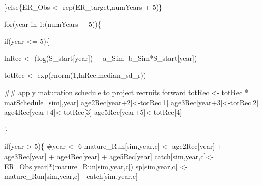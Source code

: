 \documentclass[
  11pt,
]{article}
\newenvironment{Shaded}{}{}
\newcommand{\CommentTok}[1]{\textcolor[rgb]{0.00,0.50,0.00}{#1}}
\newcommand{\ControlFlowTok}[1]{\textcolor[rgb]{0.00,0.00,1.00}{#1}}
\newcommand{\DecValTok}[1]{#1}
\newcommand{\KeywordTok}[1]{\textcolor[rgb]{0.00,0.00,1.00}{#1}}
\newcommand{\NormalTok}[1]{#1}
\newcommand{\OperatorTok}[1]{#1}
\newcommand{\StringTok}[1]{\textcolor[rgb]{0.00,0.50,0.50}{#1}}
\begin{document}
\begin{Shaded}
\begin{Highlighting}[]
{\NormalTok{        \}}\ControlFlowTok{else}\NormalTok{\{ER_Obs <-}\StringTok{ }\KeywordTok{rep}\NormalTok{(ER_target,numYears }\OperatorTok{+}\StringTok{ }\DecValTok{5}\NormalTok{)\}}
        
        
        \ControlFlowTok{for}\NormalTok{(year }\ControlFlowTok{in} \DecValTok{1}\OperatorTok{:}\NormalTok{(numYears }\OperatorTok{+}\StringTok{ }\DecValTok{5}\NormalTok{))\{}
          
          \ControlFlowTok{if}\NormalTok{(year }\OperatorTok{<=}\StringTok{ }\DecValTok{5}\NormalTok{)\{}
            
\NormalTok{            lnRec <-}\StringTok{ }\NormalTok{(}\KeywordTok{log}\NormalTok{(S_start[year]) }\OperatorTok{+}\StringTok{ }\NormalTok{a_Sim}\OperatorTok{-}\StringTok{ }\NormalTok{b_Sim}\OperatorTok{*}\NormalTok{S_start[year])}
            
\NormalTok{            totRec <-}\StringTok{ }\KeywordTok{exp}\NormalTok{(}\KeywordTok{rnorm}\NormalTok{(}\DecValTok{1}\NormalTok{,lnRec,median_sd_r))}
            
            \CommentTok{## apply maturation schedule to project recruits forward}
\NormalTok{            totRec <-}\StringTok{ }\NormalTok{totRec }\OperatorTok{*}\StringTok{ }\NormalTok{matSchedule_sim[,year]}
\NormalTok{            age2Rec[year}\OperatorTok{+}\DecValTok{2}\NormalTok{]<-totRec[}\DecValTok{1}\NormalTok{]}
\NormalTok{            age3Rec[year}\OperatorTok{+}\DecValTok{3}\NormalTok{]<-totRec[}\DecValTok{2}\NormalTok{]}
\NormalTok{            age4Rec[year}\OperatorTok{+}\DecValTok{4}\NormalTok{]<-totRec[}\DecValTok{3}\NormalTok{]}
\NormalTok{            age5Rec[year}\OperatorTok{+}\DecValTok{5}\NormalTok{]<-totRec[}\DecValTok{4}\NormalTok{]}
            
\NormalTok{          \}}
          
          \ControlFlowTok{if}\NormalTok{(year }\OperatorTok{>}\StringTok{ }\DecValTok{5}\NormalTok{)\{}
            \CommentTok{#year <- 6}
\NormalTok{            mature_Run[sim,year,c] <-}\StringTok{ }\NormalTok{age2Rec[year] }\OperatorTok{+}\StringTok{ }\NormalTok{age3Rec[year] }\OperatorTok{+}\StringTok{ }\NormalTok{age4Rec[year] }\OperatorTok{+}\StringTok{ }\NormalTok{age5Rec[year]}
\NormalTok{            catch[sim,year,c]<-ER_Obs[year]}\OperatorTok{*}\NormalTok{(mature_Run[sim,year,c])}
\NormalTok{            sp[sim,year,c] <-}\StringTok{ }\NormalTok{mature_Run[sim,year,c] }\OperatorTok{-}\StringTok{ }\NormalTok{catch[sim,year,c]}
            
}
\end{Highlighting}
\end{Shaded}
\end{document}

